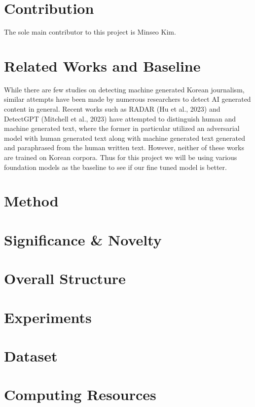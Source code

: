 \documentclass{article}
\begin{document}
\section{Contribution}
\null\quad The sole main contributor to this project is Minseo Kim.

\section{Related Works and Baseline}
\null\quad While there are few studies on detecting machine generated Korean journalism, similar attempts have been made by numerous researchers to detect AI generated content in general.
Recent works such as RADAR (Hu et al., 2023) and DetectGPT (Mitchell et al., 2023) have attempted to distinguish human and machine generated text,
where the former in particular utilized an adversarial model with human generated text along with machine generated text generated and paraphrased from the human written text. \linebreak
\null\quad However, neither of these works are trained on Korean corpora.
Thus for this project we will be using various foundation models as the baseline to see if our fine tuned model is better.

\section{Method}

\section{Significance \& Novelty}

\section{Overall Structure}

\section{Experiments}

\section{Dataset}

\section{Computing Resources}
\end{document}
